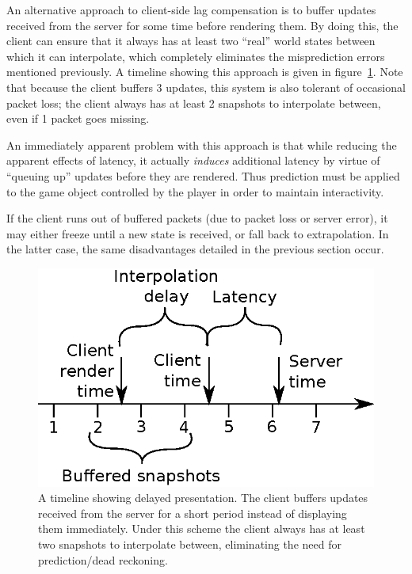 \documentclass[conference]{IEEEtran}
\begin{document}
	An alternative approach to client-side lag compensation is to buffer updates received from the server for some time before rendering them. By doing this, the client can ensure that it always has at least two ``real'' world states between which it can interpolate, which completely eliminates the misprediction errors mentioned previously. A timeline showing this approach is given in figure~\ref{fig:interpolation_timeline}. Note that because the client buffers 3 updates, this system is also tolerant of occasional packet loss; the client always has at least 2 snapshots to interpolate between, even if 1 packet goes missing.

	An immediately apparent problem with this approach is that while reducing the apparent effects of latency, it actually \emph{induces} additional latency by virtue of ``queuing up'' updates before they are rendered. Thus prediction must be applied to the game object controlled by the player in order to maintain interactivity.

	If the client runs out of buffered packets (due to packet loss or server error), it may either freeze until a new state is received, or fall back to extrapolation. In the latter case, the same disadvantages detailed in the previous section occur.

	\begin{figure}
		\centering\includegraphics[width=\linewidth]{figures/interpolation_timeline.eps}
		\caption{A timeline showing delayed presentation. The client buffers updates received from the server for a short period instead of displaying them immediately. Under this scheme the client always has at least two snapshots to interpolate between, eliminating the need for prediction/dead reckoning.}
		\label{fig:interpolation_timeline}
	\end{figure}
\end{document}
